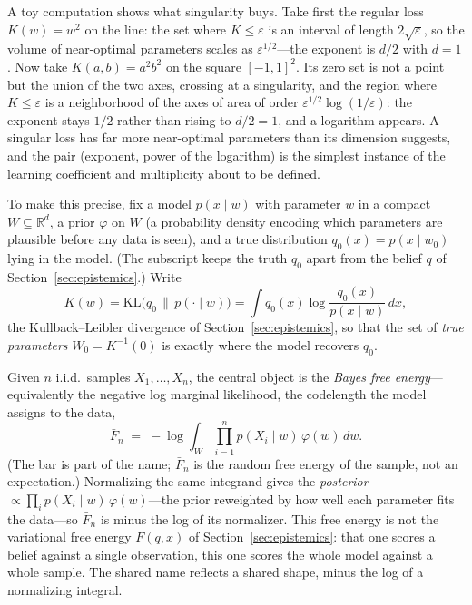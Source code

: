 A toy computation shows what singularity buys. Take first the regular loss $K(w)=w^2$ on the line: the set where $K\le\varepsilon$ is an interval of length $2\sqrt\varepsilon$, so the volume of near-optimal parameters scales as $\varepsilon^{1/2}$---the exponent is $d/2$ with $d=1$. Now take $K(a,b)=a^2b^2$ on the square $[-1,1]^2$. Its zero set is not a point but the union of the two axes, crossing at a singularity, and the region where $K\le\varepsilon$ is a neighborhood of the axes of area of order $\varepsilon^{1/2}\log(1/\varepsilon)$: the exponent stays $1/2$ rather than rising to $d/2=1$, and a logarithm appears. A singular loss has far more near-optimal parameters than its dimension suggests, and the pair (exponent, power of the logarithm) is the simplest instance of the learning coefficient and multiplicity about to be defined.

To make this precise, fix a model $p(x\mid w)$ with parameter $w$ in a compact $W\subseteq\mathbb{R}^d$, a prior $\varphi$ on $W$ (a probability density encoding which parameters are plausible before any data is seen), and a true distribution $q_0(x)=p(x\mid w_0)$ lying in the model. (The subscript keeps the truth $q_0$ apart from the belief $q$ of Section~\ref{sec:epistemics}.) Write
\[
   K(w)=\mathrm{KL}\!\bigl(q_0 \,\big\|\, p(\cdot\mid w)\bigr)=\int q_0(x)\log\frac{q_0(x)}{p(x\mid w)}\,dx ,
\]
the Kullback--Leibler divergence of Section~\ref{sec:epistemics}, so that the set of \emph{true parameters} $W_0=K^{-1}(0)$ is exactly where the model recovers $q_0$.

Given $n$ i.i.d.\ samples $X_1,\dots,X_n$, the central object is the \emph{Bayes free energy}---equivalently the negative log marginal likelihood, the codelength the model assigns to the data,
\[
   \bar F_n \;=\; -\log \int_W \prod_{i=1}^n p(X_i\mid w)\,\varphi(w)\,dw .
\]
(The bar is part of the name; $\bar F_n$ is the random free energy of the sample, not an expectation.) Normalizing the same integrand gives the \emph{posterior} $\propto\prod_i p(X_i\mid w)\,\varphi(w)$---the prior reweighted by how well each parameter fits the data---so $\bar F_n$ is minus the log of its normalizer. This free energy is not the variational free energy $F(q,x)$ of Section~\ref{sec:epistemics}: that one scores a belief against a single observation, this one scores the whole model against a whole sample. The shared name reflects a shared shape, minus the log of a normalizing integral.


